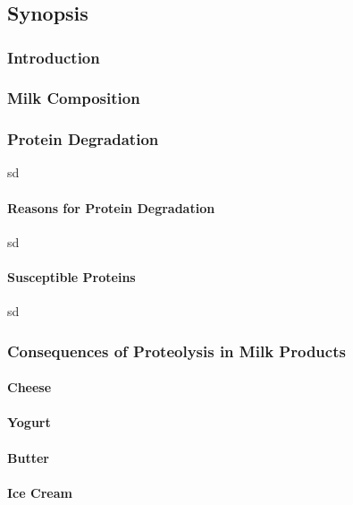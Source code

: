 
\chapter*{}
\section{Synopsis}

\subsection{Introduction}



\subsection{Milk Composition}
\cite*{02_article}

\subsection{Protein Degradation}
sd
\subsubsection{Reasons for Protein Degradation}
sd

\subsubsection{Susceptible Proteins}
sd

\subsection{Consequences of Proteolysis in Milk Products}

\subsubsection{Cheese}

\subsubsection{Yogurt}

\subsubsection{Butter}

\subsubsection{Ice Cream}

